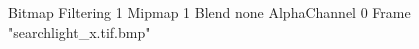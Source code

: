 {Bitmap
	{Filtering 1}
	{Mipmap 1}
	{Blend none}
	{AlphaChannel 0}
	{Frame "searchlight_x.tif.bmp"}
}
